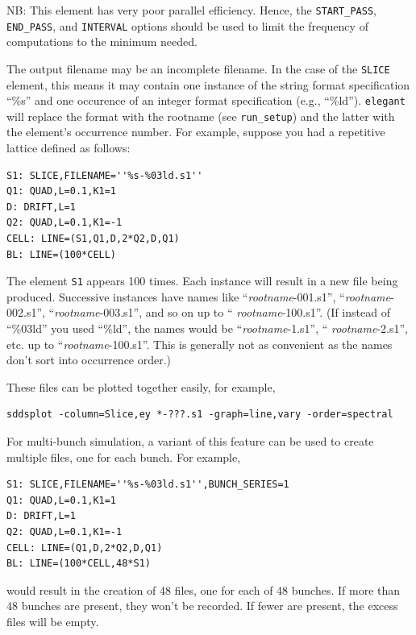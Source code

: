 NB: This element has very poor parallel efficiency. Hence, the \verb|START_PASS|, \verb|END_PASS|, and
\verb|INTERVAL| options should be used to limit the frequency of computations to the minimum needed.

The output filename may be an incomplete filename.  In the case of the
\verb|SLICE| element, this means it may contain one instance of
the string format specification ``\%s'' and one occurence of an
integer format specification (e.g., ``\%ld'').  {\tt elegant} will
replace the format with the rootname (see
\verb|run_setup|) and the latter with the element's occurrence
number.  For example, suppose you had a repetitive lattice defined as
follows:
\begin{verbatim}
S1: SLICE,FILENAME=''%s-%03ld.s1''
Q1: QUAD,L=0.1,K1=1
D: DRIFT,L=1
Q2: QUAD,L=0.1,K1=-1
CELL: LINE=(S1,Q1,D,2*Q2,D,Q1)
BL: LINE=(100*CELL)
\end{verbatim}
The element \verb|S1| appears 100 times.  Each instance will result in a new file being produced.  Successive instances
have names like ``{\em rootname}-001.s1'', ``{\em rootname}-002.s1'', ``{\em rootname}-003.s1'', and so on up to ``{\em
rootname}-100.s1''.  (If instead of ``\%03ld'' you used ``\%ld'', the names would be ``{\em rootname}-1.s1'', ``{\em
rootname}-2.s1'', etc. up to ``{\em rootname}-100.s1''.  This is generally not as convenient as the names don't sort
into occurrence order.)

These files can be plotted together easily, for example,
\begin{verbatim}
sddsplot -column=Slice,ey *-???.s1 -graph=line,vary -order=spectral
\end{verbatim}

For multi-bunch simulation, a variant of this feature can be used to create multiple files, one for
each bunch. For example,
\begin{verbatim}
S1: SLICE,FILENAME=''%s-%03ld.s1'',BUNCH_SERIES=1
Q1: QUAD,L=0.1,K1=1
D: DRIFT,L=1
Q2: QUAD,L=0.1,K1=-1
CELL: LINE=(Q1,D,2*Q2,D,Q1)
BL: LINE=(100*CELL,48*S1)
\end{verbatim}
would result in the creation of 48 files, one for each of 48 bunches. If more than 48 bunches are present,
they won't be recorded. If fewer are present, the excess files will be empty.

